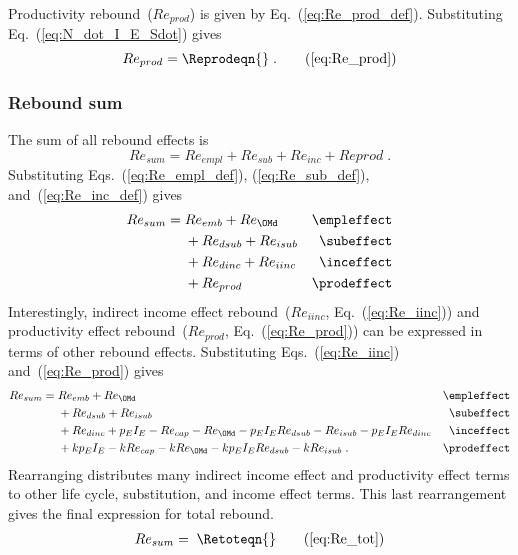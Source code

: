 \subsubsection{\Prodeffect{}} 
\label{sec:Re_prod}

Productivity rebound~($Re_{prod}$) is given by Eq.~(\ref{eq:Re_prod_def}).
Substituting Eq.~(\ref{eq:N_dot_I_E_Sdot}) gives
%
\begin{equation}
  Re_{prod} = \Reprodeqn{} \; . \tag{\ref{eq:Re_prod}}
\end{equation}


\subsubsection{Rebound sum} 
\label{sec:total_rebound}

The sum of all rebound effects is 
%
\begin{equation}
  Re_{sum} = Re_{empl} + Re_{sub} + Re_{inc} + Re{prod} \; .
\end{equation}
%
Substituting Eqs.~(\ref{eq:Re_empl_def}), (\ref{eq:Re_sub_def}), and~(\ref{eq:Re_inc_def}) gives
%
\begin{align}
  Re_{sum} = \; &Re_{emb} + Re_{\OMd}      & \mathrm{\empleffect} \nonumber \\
                &+ Re_{dsub} + Re_{isub}   & \mathrm{\subeffect}  \nonumber \\
                &+ Re_{dinc} + Re_{iinc}   & \mathrm{\inceffect}  \nonumber \\
                &+ Re_{prod}               & \mathrm{\prodeffect}
\end{align}
%
Interestingly, 
indirect income effect rebound~($Re_{iinc}$, Eq.~(\ref{eq:Re_iinc})) and
productivity effect rebound~($Re_{prod}$, Eq.~(\ref{eq:Re_prod}))
can be expressed in terms of other rebound effects.
Substituting Eqs.~(\ref{eq:Re_iinc}) and~(\ref{eq:Re_prod}) gives
%
\begin{align}
  Re_{sum} = \; &Re_{emb} + Re_{\OMd}      & \mathrm{\empleffect}                           \nonumber \\
                &+ Re_{dsub} + Re_{isub}   & \mathrm{\subeffect}                            \nonumber \\
                &+ Re_{dinc} + p_E I_E - Re_{cap} - Re_{\OMd} - p_E I_E Re_{dsub} 
                             - Re_{isub} - p_E I_E Re_{dinc}   & \mathrm{\inceffect}        \nonumber \\
                &+ k p_E I_E - k Re_{cap} - k Re_{\OMd} - k p_E I_E Re_{dsub} - k Re_{isub} \; .  & \mathrm{\prodeffect}
\end{align}
%
Rearranging distributes many indirect income effect and productivity effect terms 
to other life cycle, substitution, and income effect terms.
This last rearrangement gives the final expression for total rebound.
%
\begin{align}
  Re_{sum} = \; \Retoteqn{} \tag{\ref{eq:Re_tot}}
\end{align}


